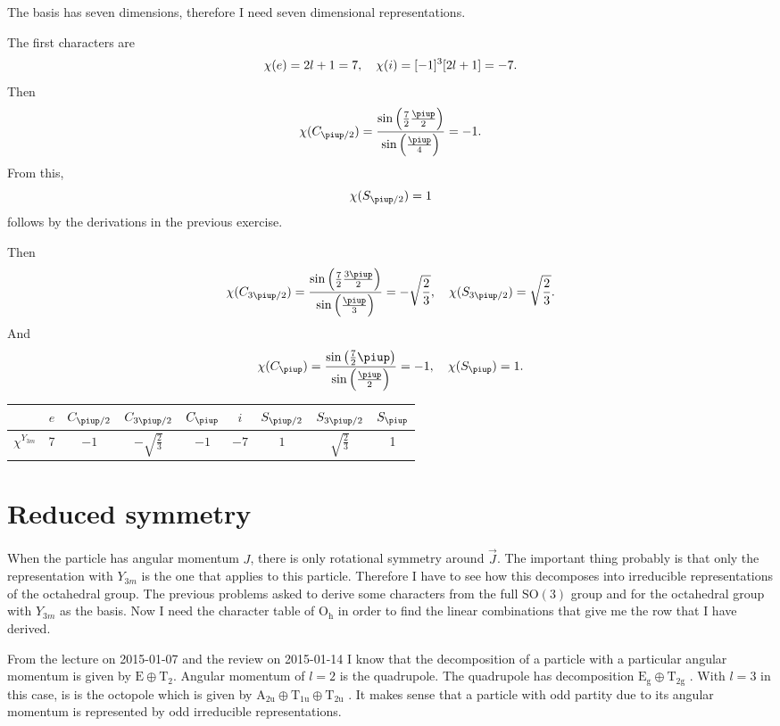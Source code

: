 \documentclass[11pt, english, fleqn, DIV=15, headinclude, BCOR=1cm]{scrartcl}
\begin{document}
The basis has seven dimensions, therefore I need seven dimensional
representations.

The first characters are
\[
    \chi(e) = 2l+1 = 7
    ,\quad
    \chi(i) = [-1]^3 [2l+1] = - 7.
\]
Then
\[
    \chi(C_{\piup/2})
    = \frac{\sin\del{\frac72 \frac\piup2}}{\sin\del{\frac\piup4}}
    = - 1.
\]
From this,
\[
    \chi(S_{\piup/2})
    = 1
\]
follows by the derivations in the previous exercise.

Then
\[
    \chi(C_{3\piup/2})
    = \frac{\sin\del{\frac72 \frac{3\piup}2}}{\sin\del{\frac\piup3}}
    = - \sqrt{\frac23}
    \eqnsep
    \chi(S_{3\piup/2}) = \sqrt{\frac23}.
\]
And
\[
    \chi(C_{\piup})
    = \frac{\sin\del{\frac72 \piup}}{\sin\del{\frac\piup2}}
    = - 1
    \eqnsep
    \chi(S_{\piup}) = 1.
\]

\begin{tabular}{c|*8c}
    & $e$ & $C_{\piup/2}$ & $C_{3\piup/2}$ & $C_{\piup}$ & $i$ & $S_{\piup/2}$ &
    $S_{3\piup/2}$ & $S_{\piup}$ \\
    \midrule
    $\chi^{Y_{3m}}$ & 7 & $-1$ & $-\sqrt{\frac23}$ & $-1$ & $-7$ & $1$ &
    $\sqrt{\frac23}$ & 1
\end{tabular}

\section{Reduced symmetry}

When the particle has angular momentum $J$, there is only rotational symmetry
around $\vec J$. The important thing probably is that only the representation
with $Y_{3m}$ is the one that applies to this particle. Therefore I have to see
how this decomposes into irreducible representations of the octahedral group.
The previous problems asked to derive some characters from the full
$\mathrm{SO}(3)$ group and for the octahedral group with $Y_{3m}$ as the basis.
Now I need the character table of $\mathrm{O_h}$ in order to find the linear
combinations that give me the row that I have derived.

From the lecture on 2015-01-07 and the review on 2015-01-14 I know that the
decomposition of a particle with a particular angular momentum is given by
$\mathrm E \oplus \mathrm T_2$. Angular momentum of $l=2$ is the quadrupole.
The quadrupole has decomposition $\mathrm{E_g} \oplus \mathrm{T_{2g}}$
\parencite{character_table_Oh}. With $l = 3$ in this case, is is the octopole
which is given by $\mathrm{A_{2u}} \oplus \mathrm{T_{1u}} \oplus
\mathrm{T_{2u}}$ \parencite{character_table_Oh}. It makes sense that a particle
with odd partity due to its angular momentum is represented by odd irreducible
representations.
\end{document}
